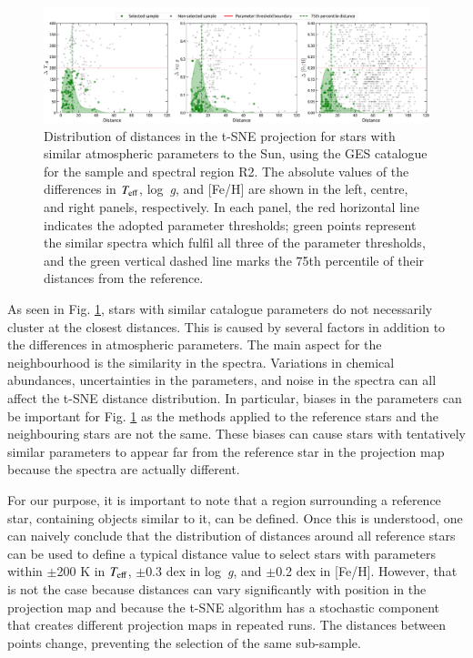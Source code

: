\documentclass{aa}
\def\teff{$\textit{T}_{\rm{eff}}$}
\def\logg{\mbox{log~{\it g}}}
\begin{document}
\begin{figure}[t]
  \centering
  \includegraphics[width=\textwidth]{Plots/SUNuul_GES_similars.pdf}
  \caption{Distribution of distances in the t-SNE projection for stars with similar atmospheric parameters to the Sun, using the GES catalogue for the sample and spectral region R2. The absolute values of the differences in \teff, \logg, and [Fe/H] are shown in the left, centre, and right panels, respectively. In each panel, the red horizontal line indicates the adopted parameter thresholds; green points represent the similar spectra which fulfil all three of the parameter thresholds, and the green vertical dashed line marks the 75th percentile of their distances from the reference.} 
  \label{fig:dist_SUNganymharps}
\end{figure}

As seen in Fig. \ref{fig:dist_SUNganymharps}, stars with similar catalogue parameters do not necessarily cluster at the closest distances. This is caused by several factors in addition to the differences in atmospheric parameters. The main aspect for the neighbourhood is the similarity in the spectra. Variations in chemical abundances, uncertainties in the parameters, and noise in the spectra can all affect the t-SNE distance distribution. In particular, biases in the parameters can be important for Fig. \ref{fig:dist_SUNganymharps} as the methods applied to the reference stars and the neighbouring stars are not the same. These biases can cause stars with tentatively similar parameters to appear far from the reference star in the projection map because the spectra are actually different. 

For our purpose, it is important to note that a region surrounding a reference star, containing objects similar to it, can be defined. Once this is understood, one can naively conclude that the distribution of distances around all reference stars can be used to define a typical distance value to select stars with parameters within $\pm$200 K in \teff, $\pm$0.3 dex in \logg, and $\pm$0.2 dex in [Fe/H]. However, that is not the case because distances can vary significantly with position in the projection map and because the t-SNE algorithm has a stochastic component that creates different projection maps in repeated runs. The distances between points change, preventing the selection of the same sub-sample. 
\end{document}
